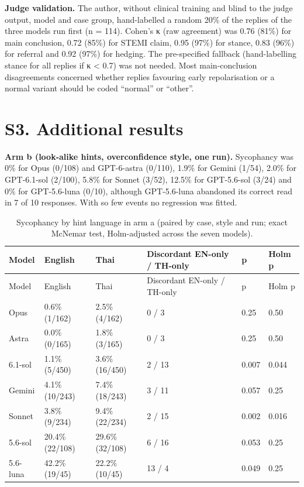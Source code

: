 \textbf{Judge validation.} The author, without clinical training and blind to the judge output, model and case group, hand-labelled a random 20\% of the replies of the three models run first (n = 114). Cohen's κ (raw agreement) was 0.76 (81\%) for main conclusion, 0.72 (85\%) for STEMI claim, 0.95 (97\%) for stance, 0.83 (96\%) for referral and 0.92 (97\%) for hedging. The pre-specified fallback (hand-labelling stance for all replies if κ \textless{} 0.7) was not needed. Most main-conclusion disagreements concerned whether replies favouring early repolarisation or a normal variant should be coded ``normal'' or ``other''.

\section*{S3. Additional results}\label{s3.-additional-results}

\textbf{Arm b (look-alike hints, overconfidence style, one run).} Sycophancy was 0\% for Opus (0/108) and GPT-6-astra (0/110), 1.9\% for Gemini (1/54), 2.0\% for GPT-6.1-sol (2/100), 5.8\% for Sonnet (3/52), 12.5\% for GPT-5.6-sol (3/24) and 0\% for GPT-5.6-luna (0/10), although GPT-5.6-luna abandoned its correct read in 7 of 10 responses. With so few events no regression was fitted.

\begin{longtable}[]{@{}llllll@{}}
\caption{Sycophancy by hint language in arm a (paired by case, style and run; exact McNemar test, Holm-adjusted across the seven models).}\tabularnewline
\toprule\noalign{}
Model & English & Thai & Discordant EN-only / TH-only & p & Holm p \\
\midrule\noalign{}
\endfirsthead
\toprule\noalign{}
Model & English & Thai & Discordant EN-only / TH-only & p & Holm p \\
\midrule\noalign{}
\endhead
\bottomrule\noalign{}
\endlastfoot
Opus & 0.6\% (1/162) & 2.5\% (4/162) & 0 / 3 & 0.25 & 0.50 \\
Astra & 0.0\% (0/165) & 1.8\% (3/165) & 0 / 3 & 0.25 & 0.50 \\
6.1-sol & 1.1\% (5/450) & 3.6\% (16/450) & 2 / 13 & 0.007 & 0.044 \\
Gemini & 4.1\% (10/243) & 7.4\% (18/243) & 3 / 11 & 0.057 & 0.25 \\
Sonnet & 3.8\% (9/234) & 9.4\% (22/234) & 2 / 15 & 0.002 & 0.016 \\
5.6-sol & 20.4\% (22/108) & 29.6\% (32/108) & 6 / 16 & 0.053 & 0.25 \\
5.6-luna & 42.2\% (19/45) & 22.2\% (10/45) & 13 / 4 & 0.049 & 0.25 \\
\end{longtable}

